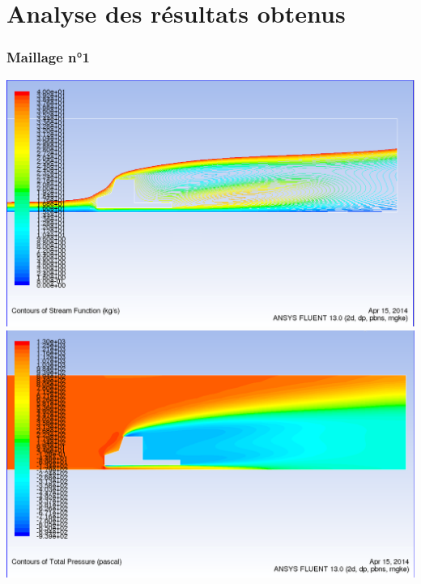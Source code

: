 \documentclass[handout]{beamer}
\begin{document}
\section[Résultats]{Analyse des résultats obtenus}
\begin{frame}
	\frametitle{Maillage n°1}
	\begin{center}
	\includegraphics[scale=0.15]{../resultsCx/camion110_stream.png}\\
	\includegraphics[scale=0.15]{../resultsCx/camion110_pressure.png}
	\end{center}
\end{frame}
\end{document}
